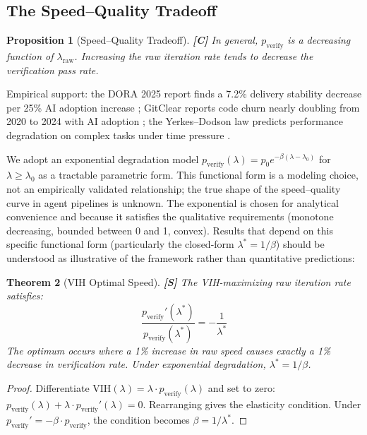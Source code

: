 \documentclass[11pt,a4paper]{article}
\newtheorem{theorem}{Theorem}[section]
\newtheorem{proposition}[theorem]{Proposition}
\theoremstyle{definition}
\theoremstyle{remark}
\newcommand{\VIH}{\mathrm{VIH}}
\begin{document}
\subsection{The Speed--Quality Tradeoff}

\begin{proposition}[Speed--Quality Tradeoff]\label{prop:tradeoff}
\textbf{[C]} In general, $p_{\mathrm{verify}}$ is a decreasing function of $\lambda_{\mathrm{raw}}$. Increasing the raw iteration rate tends to decrease the verification pass rate.
\end{proposition}

Empirical support: the DORA 2025 report finds a 7.2\% delivery stability decrease per 25\% AI adoption increase \citep{dora2025}; GitClear reports code churn nearly doubling from 2020 to 2024 with AI adoption \citep{gitclear2025}; the Yerkes--Dodson law predicts performance degradation on complex tasks under time pressure \citep{yerkes1908relation}.

We adopt an exponential degradation model $p_{\mathrm{verify}}(\lambda) = p_0 e^{-\beta(\lambda - \lambda_0)}$ for $\lambda \geq \lambda_0$ as a tractable parametric form. This functional form is a modeling choice, not an empirically validated relationship; the true shape of the speed--quality curve in agent pipelines is unknown. The exponential is chosen for analytical convenience and because it satisfies the qualitative requirements (monotone decreasing, bounded between 0 and 1, convex). Results that depend on this specific functional form (particularly the closed-form $\lambda^* = 1/\beta$) should be understood as illustrative of the framework rather than quantitative predictions:

\begin{theorem}[VIH Optimal Speed]\label{thm:vih-opt}
\textbf{[S]} The VIH-maximizing raw iteration rate satisfies:
\[
    \frac{p_{\mathrm{verify}}'(\lambda^*)}{p_{\mathrm{verify}}(\lambda^*)} = -\frac{1}{\lambda^*}
\]
The optimum occurs where a 1\% increase in raw speed causes exactly a 1\% decrease in verification rate. Under exponential degradation, $\lambda^* = 1/\beta$.
\end{theorem}

\begin{proof}
Differentiate $\VIH(\lambda) = \lambda \cdot p_{\mathrm{verify}}(\lambda)$ and set to zero: $p_{\mathrm{verify}}(\lambda) + \lambda \cdot p_{\mathrm{verify}}'(\lambda) = 0$. Rearranging gives the elasticity condition. Under $p_{\mathrm{verify}}' = -\beta \cdot p_{\mathrm{verify}}$, the condition becomes $\beta = 1/\lambda^*$.
\end{proof}
\end{document}
